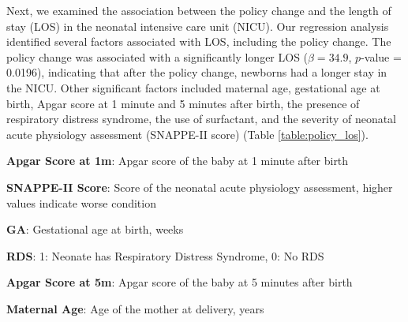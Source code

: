 \documentclass[11pt]{article}
\begin{document}
Next, we examined the association between the policy change and the length of stay (LOS) in the neonatal intensive care unit (NICU). Our regression analysis identified several factors associated with LOS, including the policy change. The policy change was associated with a significantly longer LOS ($\beta = 34.9$, $p$-value = 0.0196), indicating that after the policy change, newborns had a longer stay in the NICU. Other significant factors included maternal age, gestational age at birth, Apgar score at 1 minute and 5 minutes after birth, the presence of respiratory distress syndrome, the use of surfactant, and the severity of neonatal acute physiology assessment (SNAPPE-II score) (Table \ref{table:policy_los}).

\begin{table}[h]
\caption{Association between policy change and Length of Stay}
\label{table:policy_los}
\begin{threeparttable}
\renewcommand{\TPTminimum}{\linewidth}
\begin{tablenotes}
\footnotesize
\item \textbf{Apgar Score at 1m}: Apgar score of the baby at 1 minute after birth
\item \textbf{SNAPPE-II Score}: Score of the neonatal acute physiology assessment, higher values indicate worse condition
\item \textbf{GA}: Gestational age at birth, weeks
\item \textbf{RDS}: 1: Neonate has Respiratory Distress Syndrome, 0: No RDS
\item \textbf{Apgar Score at 5m}: Apgar score of the baby at 5 minutes after birth
\item \textbf{Maternal Age}: Age of the mother at delivery, years
\end{tablenotes}
\end{threeparttable}
\end{table}
\end{document}
